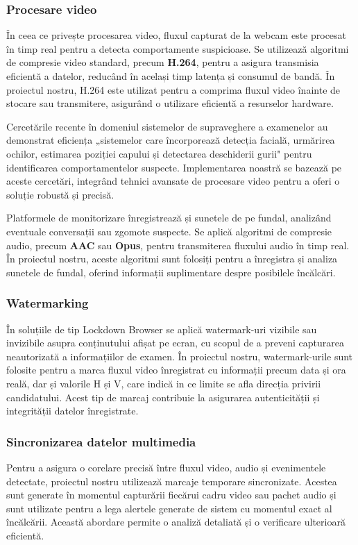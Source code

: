 \documentclass[12pt,a4paper]{article}
\begin{document}
\subsubsection{Procesare video}
În ceea ce privește procesarea video, fluxul capturat de la webcam este procesat în
timp real pentru a detecta comportamente suspicioase. Se utilizează algoritmi de
compresie video standard, precum \textbf{H.264}, pentru a asigura transmisia
eficientă a datelor, reducând în același timp latența și consumul de
bandă\cite{academic3}. În proiectul nostru, H.264 este utilizat pentru a comprima fluxul video înainte de stocare sau transmitere, asigurând o utilizare eficientă a resurselor hardware.

Cercetările recente în domeniul sistemelor de supraveghere a examenelor au demonstrat eficiența 
„sistemelor care încorporează detecția facială, urmărirea ochilor, estimarea poziției capului și 
detectarea deschiderii gurii"\cite{face_tracking_research} pentru identificarea comportamentelor suspecte. 
Implementarea noastră se bazează pe aceste cercetări, integrând tehnici avansate de procesare video 
pentru a oferi o soluție robustă și precisă.

Platformele de monitorizare înregistrează și sunetele de pe fundal, analizând 
eventuale conversații sau zgomote suspecte. Se aplică algoritmi de compresie audio, 
precum \textbf{AAC} sau \textbf{Opus}, pentru transmiterea fluxului audio în timp real. În proiectul nostru, aceste algoritmi sunt folosiți pentru a înregistra și analiza sunetele de fundal, oferind informații suplimentare despre posibilele încălcări.

\subsubsection{Watermarking}
În soluțiile de tip Lockdown Browser se aplică watermark-uri vizibile sau invizibile asupra conținutului afișat pe ecran, cu scopul de a preveni capturarea neautorizată a informațiilor de examen. În proiectul nostru, watermark-urile sunt folosite pentru a marca fluxul video înregistrat cu informații precum data și ora reală, dar și valorile H și V, care indică in ce limite se afla direcția privirii candidatului. Acest tip de marcaj contribuie la asigurarea autenticității și integrității datelor înregistrate.

\subsubsection{Sincronizarea datelor multimedia}
Pentru a asigura o corelare precisă între fluxul video, audio și evenimentele detectate, proiectul nostru utilizează marcaje temporare sincronizate. Acestea sunt generate în momentul capturării fiecărui cadru video sau pachet audio și sunt utilizate pentru a lega alertele generate de sistem cu momentul exact al încălcării. Această abordare permite o analiză detaliată și o verificare ulterioară eficientă.
\end{document}
